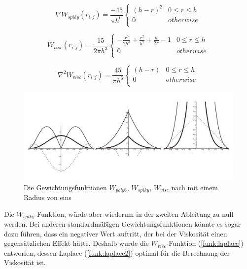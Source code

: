 \documentclass[intern,palatino]{cgBA}
\begin{document}
\begin{equation}\label{funk:gradient2}
\nabla W_{spiky}(r_{i,j}) = \frac{-45}{\pi h^6}   
\begin{cases}
(h - r)^2 		& 0	\leq r \leq h	\\
0					& otherwise			\\
\end{cases}
\end{equation}

\begin{equation}\label{funk:laplace}
W_{visc}(r_{i,j}) = \frac{15}{2 \pi h^3}   
\begin{cases}
-\frac{r^3}{2h^3} + \frac{r^2}{h^2} + \frac{h}{2r} -1  		& 0	\leq r \leq h	\\
0					& otherwise			\\
\end{cases}
\end{equation}

\begin{equation}\label{funk:laplace2}
\nabla ^2 W_{visc}(r_{i,j}) = \frac{45}{\pi h^6}
\begin{cases}
(h-r) 		& 0	\leq r \leq h	\\
0					& otherwise			\\
\end{cases}
\end{equation}

\begin{figure}[h]
	\centering
	\includegraphics[width=0.7\columnwidth]{Bilder/kernel.jpg}
	\caption{Die Gewichtungsfunktionen $W_{poly6}$, $W_{spiky}$, $W_{visc}$ nach \cite{muller2003particle} mit einem Radius von eins}
	\label{img:kernel}
\end{figure}
Die $W_{spiky}$-Funktion, würde aber wiederum in der zweiten Ableitung zu null werden. Bei anderen standardmäßigen Gewichtungsfunktionen könnte es sogar dazu führen, dass ein negativer Wert auftritt, der bei der Viskosität einen gegensätzlichen Effekt hätte. Deshalb wurde die $W_{visc}$-Funktion (\ref{funk:laplace}) entworfen, dessen Laplace (\ref{funk:laplace2}) optimal für die Berechnung der Viskosität ist.
\newline
\end{document}
